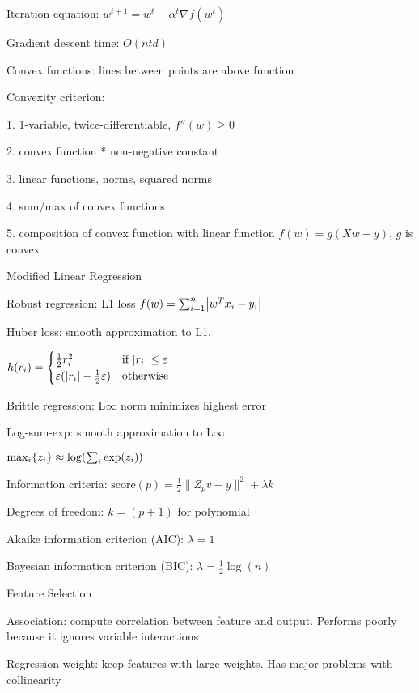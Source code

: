 \documentclass[10pt]{article}
\makeatletter
\newcommand{\tab}{\hspace{.02\textwidth}}
\newcommand{\set}[1]{\left\{#1\right\}}
\newcommand{\abs}[1]{\left|#1\right|}
\let\originalleft\left
\let\originalright\right
\renewcommand{\left}{\mathopen{}\mathclose\bgroup\originalleft}
\renewcommand{\right}{\aftergroup\egroup\originalright}
\renewcommand{\section}{\@startsection{section}{1}{0ex}{-1ex}{0.7ex}
                        {\normalfont\normalsize\bfseries}}
\newcommand{\norm}[1]{\lVert #1 \rVert}
\newcommand{\ep}{\varepsilon}
\makeatother
\begin{document}
\begin{multicols*}{3}
Iteration equation: $w^{t+1}=w^t-\alpha^t\nabla f(w^t)$

Gradient descent time: $O(ntd)$

Convex functions: lines between points are above function

Convexity criterion:

1. 1-variable, twice-differentiable, $f''(w)\ge 0$

2. convex function * non-negative constant

3. linear functions, norms, squared norms

4. sum/max of convex functions

5. composition of convex function with linear function $f(w)=g(Xw-y)$, $g$ is convex

\section{Modified Linear Regression}

Robust regression: L1 loss $f(w)=\sum_{i=1}^n\abs{w^Tx_i-y_i}$

Huber loss: smooth approximation to L1. 

\tab $h(r_i)=\begin{cases}
  \frac 12r_i^2 & \text{if }\abs{r_i}\le\ep\\
  \ep(\abs{r_i}-\frac 12\ep) & \text{otherwise}
\end{cases}$

Brittle regression: L$\infty$ norm minimizes highest error

Log-sum-exp: smooth approximation to L$\infty$

\tab $\max_i\set{z_i}\approx\log(\sum_i\exp(z_i))$

Information criteria: $\text{score}(p)=\frac 12\norm{Z_pv-y}^2+\lambda k$

Degrees of freedom: $k=(p+1)$ for polynomial

Akaike information criterion (AIC): $\lambda=1$

Bayesian information criterion (BIC): $\lambda=\frac 12\log(n)$

\section{Feature Selection}

Association: compute correlation between feature and output. Performs poorly because it ignores variable interactions

Regression weight: keep features with large weights. Has major problems with collinearity


\end{multicols*}
\end{document}
